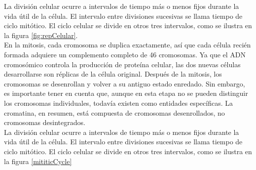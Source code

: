 \documentclass[]{article}
\begin{document}

La división celular ocurre a intervalos de tiempo más o menos fijos durante la vida útil de la célula. El intervalo entre divisiones sucesivas se llama tiempo de ciclo mitótico. El ciclo celular se divide en otros tres intervalos, como se ilustra en la figura  \ref{fig:repCelular}.\\

En la mitosis, cada cromosoma se duplica exactamente, así que cada célula recién formada adquiere un complemento completo de 46 cromosomas. Ya que el ADN cromosómico controla la producción de proteína celular, las dos nuevas células desarrollarse son réplicas de la célula original. Después de la mitosis, los cromosomas se desenrollan y volver a su antiguo estado enredado. Sin embargo, es importante tener en cuenta que, aunque en esta etapa no se pueden distinguir los cromosomas individuales, todavía existen como entidades específicas. La cromatina, en resumen, está compuesta de cromosomas desenrollados, no cromosomas desintegrados.\\

La división celular ocurre a intervalos de tiempo más o menos fijos durante la vida útil de la célula. El intervalo entre divisiones sucesivas se llama tiempo de ciclo mitótico. El ciclo celular se divide en otros tres intervalos, como se ilustra en la figura \ref{mititicCycle} \\
\end{document}
